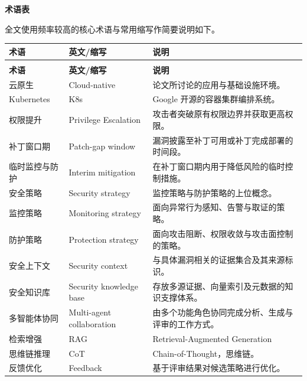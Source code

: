 \vspace{0.45em}

{\noindent\large\textbf{术语表}\par}
\vspace{0.2em}

全文使用频率较高的核心术语与常用缩写作简要说明如下。
\begingroup
\small
\setlength{\tabcolsep}{4pt}
\renewcommand{\arraystretch}{0.88}
\begin{longtable}{>{\centering\arraybackslash}p{2cm} >{\centering\arraybackslash}p{3.6cm} >{\raggedright\arraybackslash}p{7.8cm}}
\toprule
\textbf{术语} & \textbf{英文/缩写} & \textbf{说明} \\
\midrule
\endfirsthead
\multicolumn{3}{c}{\small\textbf{术语表（续）}} \\[0.3ex]
\toprule
\textbf{术语} & \textbf{英文/缩写} & \textbf{说明} \\
\midrule
\endhead
\midrule
\endfoot
\bottomrule
\endlastfoot
云原生 & Cloud-native & 论文所讨论的应用与基础设施环境。 \\
Kubernetes & K8s & Google 开源的容器集群编排系统。 \\
权限提升 & Privilege Escalation & 攻击者突破原有权限边界并获取更高权限。 \\
补丁窗口期 & Patch-gap window & 漏洞披露至补丁可用或补丁完成部署的时间段。 \\
临时监控与防护 & Interim mitigation & 在补丁窗口期内用于降低风险的临时控制措施。 \\
安全策略 & Security strategy & 监控策略与防护策略的上位概念。 \\
监控策略 & Monitoring strategy & 面向异常行为感知、告警与取证的策略。 \\
防护策略 & Protection strategy & 面向攻击阻断、权限收敛与攻击面控制的策略。 \\
安全上下文 & Security context & 与具体漏洞相关的证据集合及其来源标识。 \\
安全知识库 & Security knowledge base & 存放多源证据、向量索引及元数据的知识支撑体系。 \\
多智能体协同 & Multi-agent collaboration & 由多个功能角色协同完成分析、生成与评审的工作方式。 \\
检索增强 & RAG & Retrieval-Augmented Generation \\
思维链推理 & CoT & Chain-of-Thought，思维链。 \\
反馈优化 & Feedback & 基于评审结果对候选策略进行优化。 \\
\end{longtable}
\endgroup

